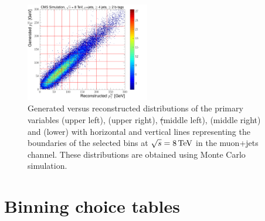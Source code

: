 \begin{figure}[hbtp]
	 \includegraphics[width=0.48\textwidth]{Chapters/04_Analysis/04b_XSections/images/binning/muon_WPT_8TeV.pdf}\hfill
	 \caption{Generated versus reconstructed distributions of the primary variables \met (upper left), \HT (upper
	 right), \st (middle left), \mt (middle right) and \wpt (lower) with horizontal and vertical lines
	 representing the boundaries of the selected bins at $\sqrt{s}=8\,\text{Te\hspace{-.08em}V}$ in the muon+jets channel. These
	 distributions are obtained using \ttbar Monte Carlo simulation.}
     \label{fig:binning_8TeV_muon}
 \end{figure}
 
\clearpage


\section{Binning choice tables}
\label{as:binning_tables_electron}






\clearpage


